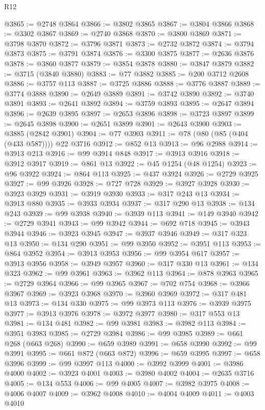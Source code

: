 \begin{lexlean}{R12}
\begin{coremodule}
{{{{{{{{{{{{{{{{{{{{{{{{{{{{{{{{{{{{{{{{{{{{{{{{{{{{{{{{{{{{{{{{{{{{{{{{{{{{{{{{{{{{{{{{{{{{{{{{{{{{{{{{{{@3865 := @2748 @3864
@3866 := @3802 @3865
@3867 := @3804 @3866
@3868 := @3302 @3867
@3869 := @2740 @3868
@3870 := @3800 @3869
@3871 := @3798 @3870
@3872 := @3796 @3871
@3873 := @2732 @3872
@3874 := @3794 @3873
@3875 := @3791 @3874
@3876 := @3300 @3875
@3877 := @2636 @3876
@3878 := @3860 @3877
@3879 := @3854 @3878
@3880 := @3847 @3879
@3882 := @3715 (@3840 @3880)
@3883 := @77 @3882
@3885 := @200 @3712 @2608
@3886 := @3757 @113
@3887 := @3725 @3886
@3888 := @3776 @3887
@3889 := @3774 @3888
@3890 := @2649 @3889
@3891 := @3742 @3890
@3892 := @3740 @3891
@3893 := @2641 @3892
@3894 := @3759 @3893
@3895 := @2647 @3894
@3896 := @2639 @3895
@3897 := @2653 @3896
@3898 := @3723 @3897
@3899 := @2645 @3898
@3900 := @2651 @3899
@3901 := @2643 @3900
@3903 := @3885 (@2842 @3901)
@3904 := @77 @3903
@3911 := @78 (@80 (@85 (@404 (@433 @587)))) @22 @3716
@3912 := @852 @13
@3913 := @96 @2988
@3914 := @3913 @213
@3916 := @99 @3914 @848
@3917 := @3913 @3916
@3918 := @3912 @3917
@3919 := @861 @13
@3922 := @45 @1254 (@48 @1254)
@3923 := @96 @3922
@3924 := @864 @113
@3925 := @437 @3924
@3926 := @2729 @3925
@3927 := @99 @3926
@3928 := @727 @728
@3929 := @3927 @3928
@3930 := @3923 @3929
@3931 := @3919 @3930
@3933 := @317 @243 @13
@3934 := @3913 @880
@3935 := @3933 @3934
@3937 := @317 @290 @13
@3938 := @134 @243
@3939 := @99 @3938
@3940 := @3939 @113
@3941 := @149 @3940
@3942 := @2729 @3941
@3943 := @99 @3942
@3944 := @692 @718
@3945 := @3943 @3944
@3946 := @3923 @3945
@3947 := @3937 @3946
@3949 := @317 @323 @13
@3950 := @134 @290
@3951 := @99 @3950
@3952 := @3951 @113
@3953 := @864 @3952
@3954 := @3913 @3953
@3956 := @99 @3954 @617
@3957 := @3913 @3956
@3958 := @3949 @3957
@3960 := @317 @330 @13
@3961 := @134 @323
@3962 := @99 @3961
@3963 := @3962 @113
@3964 := @878 @3963
@3965 := @2729 @3964
@3966 := @99 @3965
@3967 := @702 @754
@3968 := @3966 @3967
@3969 := @3923 @3968
@3970 := @3960 @3969
@3972 := @317 @481 @13
@3973 := @134 @330
@3975 := @99 @3973 @113
@3976 := @3939 @3975
@3977 := @3913 @3976
@3978 := @3972 @3977
@3980 := @317 @553 @13
@3981 := @134 @481
@3982 := @99 @3981
@3983 := @3982 @113
@3984 := @3951 @3983
@3985 := @2729 @3984
@3986 := @99 @3985
@3989 := @661 @268 (@663 @268)
@3990 := @659 @3989
@3991 := @658 @3990
@3992 := @99 @3991
@3995 := @661 @872 (@663 @872)
@3996 := @659 @3995
@3997 := @658 @3996
@3999 := @99 @3997 @113
@4000 := @3992 @3999
@4001 := @3986 @4000
@4002 := @3923 @4001
@4003 := @3980 @4002
@4004 := @2635 @3716
@4005 := @134 @553
@4006 := @99 @4005
@4007 := @3982 @3975
@4008 := @4006 @4007
@4009 := @3962 @4008
@4010 := @4004 @4009
@4011 := @4003 @4010
}}}}}}}}}}}}}}}}}}}}}}}}}}}}}}}}}}}}}}}}}}}}}}}}}}}}}}}}}}}}}}}}}}}}}}}}}}}}}}}}}}}}}}}}}}}}}}}}}}}}}}}}}}
\end{coremodule}
\end{lexlean}
